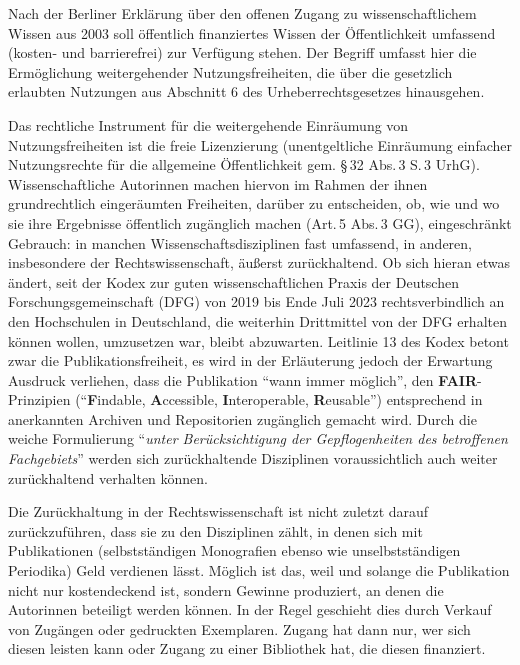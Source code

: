 \documentclass[a4paper,
fontsize=11pt,
oneside,
numbers=noperiodatend,
parskip=half-,
bibliography=totoc,
final
]{scrartcl}
\begin{document}
Nach der Berliner Erklärung über den offenen Zugang zu
wissenschaftlichem Wissen aus 2003 soll öffentlich finanziertes Wissen
der Öffentlichkeit umfassend (kosten- und barrierefrei) zur Verfügung
stehen. Der Begriff umfasst hier die Ermöglichung weitergehender
Nutzungsfreiheiten, die über die gesetzlich erlaubten Nutzungen aus
Abschnitt 6 des Urheberrechtsgesetzes hinausgehen.

Das rechtliche Instrument für die weitergehende Einräumung von
Nutzungsfreiheiten ist die freie Lizenzierung (unentgeltliche Einräumung
einfacher Nutzungsrechte für die allgemeine Öffentlichkeit gem. §\,32
Abs.\,3 S.\,3 UrhG). Wissenschaftliche Autorinnen machen hiervon im
Rahmen der ihnen grundrechtlich eingeräumten Freiheiten, darüber zu
entscheiden, ob, wie und wo sie ihre Ergebnisse öffentlich zugänglich
machen (Art.\,5 Abs.\,3 GG), eingeschränkt Gebrauch: in manchen
Wissenschaftsdisziplinen fast umfassend, in anderen, insbesondere der
Rechtswissenschaft, äußerst zurückhaltend. Ob sich hieran etwas ändert,
seit der Kodex zur guten wissenschaftlichen Praxis der Deutschen
Forschungsgemeinschaft (DFG) von 2019 bis Ende Juli 2023
rechtsverbindlich an den Hochschulen in Deutschland, die weiterhin
Drittmittel von der DFG erhalten können wollen, umzusetzen war, bleibt
abzuwarten. Leitlinie 13 des Kodex betont zwar die Publikationsfreiheit,
es wird in der Erläuterung jedoch der Erwartung Ausdruck verliehen, dass
die Publikation \enquote{wann immer möglich}, den
\textbf{FAIR}-Prinzipien (\enquote{\textbf{F}indable,
\textbf{A}ccessible, \textbf{I}nteroperable, \textbf{R}eusable})
entsprechend in anerkannten Archiven und Repositorien zugänglich gemacht
wird. Durch die weiche Formulierung \enquote{\emph{unter
Berücksichtigung der Gepflogenheiten des betroffenen Fachgebiets}}
werden sich zurückhaltende Disziplinen voraussichtlich auch weiter
zurückhaltend verhalten können.

Die Zurückhaltung in der Rechtswissenschaft ist nicht zuletzt darauf
zurückzuführen, dass sie zu den Disziplinen zählt, in denen sich mit
Publikationen (selbstständigen Monografien ebenso wie unselbstständigen
Periodika) Geld verdienen lässt. Möglich ist das, weil und solange die
Publikation nicht nur kostendeckend ist, sondern Gewinne produziert, an
denen die Autorinnen beteiligt werden können. In der Regel geschieht
dies durch Verkauf von Zugängen oder gedruckten Exemplaren. Zugang hat
dann nur, wer sich diesen leisten kann oder Zugang zu einer Bibliothek
hat, die diesen finanziert.
\end{document}
